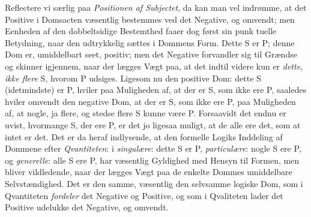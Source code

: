 \documentclass[12pt]{book}
\newcommand{\opage}[1]{\marginnote{\footnotesize\textit{[#1]}}}
\begin{document}
Reflectere vi særlig paa \emph{Positionen af Subjectet}, da kan man vel indrømme, at det Positive i Domsacten væsentlig bestemmes ved det Negative, og omvendt; men Eenheden af den dobbeltsidige Bestemthed faaer dog først sin punk%
\opage{56}tuelle Betydning, naar den udtrykkelig sættes i Dommens Form. Dette S er P; denne Dom er, umiddelbart seet, positiv; men det Negative forvandler sig til Grændse og skinner igjennem, naar der lægges Vægt paa, at det indtil videre kun er \emph{dette, ikke flere} S, hvorom P udsiges. Ligesom nu den positive Dom: dette S (idetmindste) er P, hviler paa Muligheden af, at der er S, som ikke ere P, saaledes hviler omvendt den negative Dom, at der er S, som ikke ere P, paa Muligheden af, at nogle, ja flere, og stedse flere S kunne være P. Forsaavidt det endnu er uvist, hvormange S, der ere P, er det jo ligesaa muligt, at de alle ere det, som at intet er det. Det er da heraf indlysende, at den formelle Logiks Inddeling af Dommene efter \emph{Qvantiteten}: i \emph{singulære}: dette S er P, \emph{particulære}: nogle S ere P, og \emph{generelle}: alle S ere P, har væsentlig Gyldighed med Hensyn til Formen, men bliver vildledende, naar der lægges Vægt paa de enkelte Dommes umiddelbare Selvstændighed. Det er den samme, væsentlig den selvsamme logiske Dom, som i Qvantiteten \emph{fordeler} det Negative og Positive, og som i Qvaliteten lader det Positive udelukke det Negative, og omvendt.
\end{document}
